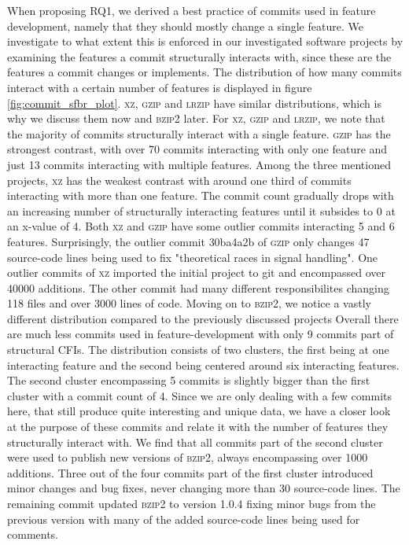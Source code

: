 When proposing RQ1, we derived a best practice of commits used in feature development, namely that they should mostly change a single feature.
We investigate to what extent this is enforced in our investigated software projects by examining the features a commit structurally interacts with, since these are the features a commit changes or implements.
The distribution of how many commits interact with a certain number of features is displayed in figure \ref{fig:commit_sfbr_plot}.
\textsc{xz}, \textsc{gzip} and \textsc{lrzip} have similar distributions, which is why we discuss them now and \textsc{bzip2} later.
For \textsc{xz}, \textsc{gzip} and \textsc{lrzip}, we note that the majority of commits structurally interact with a single feature.
\textsc{gzip} has the strongest contrast, with over 70 commits interacting with only one feature and just 13 commits interacting with multiple features.
Among the three mentioned projects, \textsc{xz} has the weakest contrast with around one third of commits interacting with more than one feature.
The commit count gradually drops with an increasing number of structurally interacting features until it subsides to 0 at an x-value of 4.
Both \textsc{xz} and \textsc{gzip} have some outlier commits interacting 5 and 6 features.
Surprisingly, the outlier commit \textsf{30ba4a2b} of \textsc{gzip} only changes 47 source-code lines being used to fix "theoretical races in signal handling".
One outlier commits of \textsc{xz} imported the initial project to git and encompassed over 40000 additions.
The other commit had many different responsibilites changing 118 files and over 3000 lines of code.
Moving on to \textsc{bzip2}, we notice a vastly different distribution compared to the previously discussed projects
Overall there are much less commits used in feature-development with only 9 commits part of structural CFIs.
The distribution consists of two clusters, the first being at one interacting feature and the second being centered around six interacting features.
The second cluster encompassing 5 commits is slightly bigger than the first cluster with a commit count of 4.
Since we are only dealing with a few commits here, that still produce quite interesting and unique data, we have a closer look at the purpose of these commits and relate it with the number of features they structurally interact with.
We find that all commits part of the second cluster were used to publish new versions of \textsc{bzip2}, always encompassing over 1000 additions.
Three out of the four commits part of the first cluster introduced minor changes and bug fixes, never changing more than 30 source-code lines.
The remaining commit updated \textsc{bzip2} to version 1.0.4 fixing minor bugs from the previous version with many of the added source-code lines being used for comments. 

